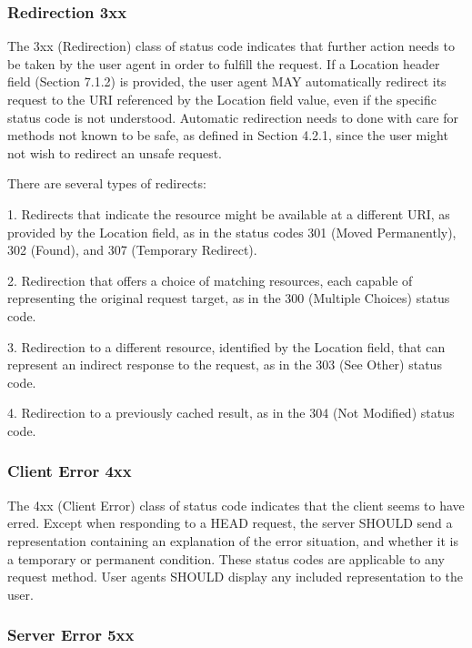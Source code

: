    \subsubsection{Redirection 3xx}

   The 3xx (Redirection) class of status code indicates that further
   action needs to be taken by the user agent in order to fulfill the
   request.  If a Location header field (Section 7.1.2) is provided, the
   user agent MAY automatically redirect its request to the URI
   referenced by the Location field value, even if the specific status
   code is not understood.  Automatic redirection needs to done with
   care for methods not known to be safe, as defined in Section 4.2.1,
   since the user might not wish to redirect an unsafe request.

   There are several types of redirects:

   1.  Redirects that indicate the resource might be available at a
       different URI, as provided by the Location field, as in the
       status codes 301 (Moved Permanently), 302 (Found), and 307
       (Temporary Redirect).

   2.  Redirection that offers a choice of matching resources, each
       capable of representing the original request target, as in the
       300 (Multiple Choices) status code.

   3.  Redirection to a different resource, identified by the Location
       field, that can represent an indirect response to the request, as
       in the 303 (See Other) status code.

   4.  Redirection to a previously cached result, as in the 304 (Not
       Modified) status code.



\subsubsection{Client Error 4xx}

   The 4xx (Client Error) class of status code indicates that the client
   seems to have erred.  Except when responding to a HEAD request, the
   server SHOULD send a representation containing an explanation of the
   error situation, and whether it is a temporary or permanent
   condition.  These status codes are applicable to any request method.
   User agents SHOULD display any included representation to the user.




\subsubsection{Server Error 5xx}

